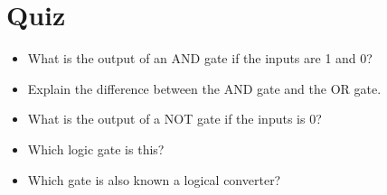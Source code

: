 \documentclass{article}
\begin{document}
\section{Quiz}

\begin{itemize}
	
	\item What is the output of an AND gate if the inputs are 1 and 0?
	\item Explain the difference between the AND gate and the OR gate.
	\item What is the output of a NOT gate if the inputs is 0?
	\item Which logic gate is this?
	\item Which gate is also known 
	a logical converter?
	
\end{itemize}

\newpage


\end{document}
